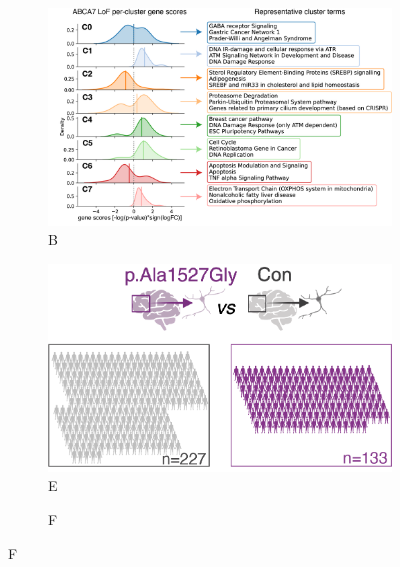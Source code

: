 \begin{figure}[H]
\begin{subfigure}[t]{0.47\textwidth}
    \end{subfigure}
    \begin{subfigure}[t]{0.45\textwidth}
        \caption{B}
        \includegraphics[width=\textwidth]{./main_plots/kl_densities.png}        
    \end{subfigure}
    \begin{subfigure}[t]{0.3\textwidth}
        \caption{E}
        \includegraphics[width=\textwidth]{./main_plots/common_var_cohort_cartoon.png}        
    \end{subfigure}
    \hspace{0.01\textwidth} %
    \begin{subfigure}[t]{0.225\textwidth}
        \caption{F}

\end{subfigure}
\end{figure}

